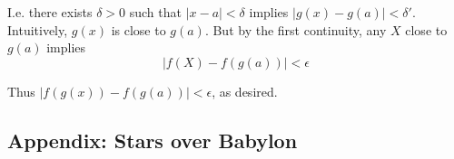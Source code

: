 \vs

I.e. there exists $\delta>0$ such that $|x-a|<\delta$ implies
$|g(x)-g(a)|<\delta'$. Intuitively, $g(x)$ is close to $g(a)$. But by the
first continuity, any $X$ close to $g(a)$ implies
\[|f(X)-f(g(a))|<\epsilon\]

Thus $|f(g(x))-f(g(a))|<\epsilon$, as desired.

\subsection{Appendix: Stars over Babylon}

